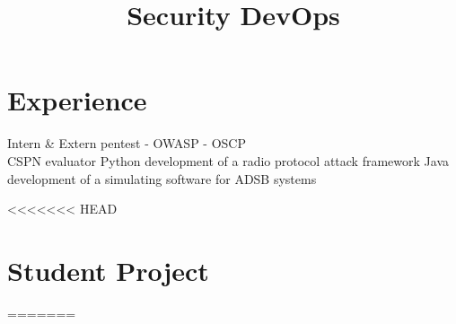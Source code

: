 \documentclass[11pt,a4paper,francais]{moderncv}
\title{Security DevOps}
\begin{document}
\maketitle
\vspace*{-3\baselineskip}

\section{Experience}
{Intern \& Extern pentest - OWASP - OSCP\\
CSPN evaluator}
{Python development of a radio protocol attack framework}
{Java development of a simulating software for ADSB systems}

<<<<<<< HEAD
\section{Student Project}
=======
\end{document}
